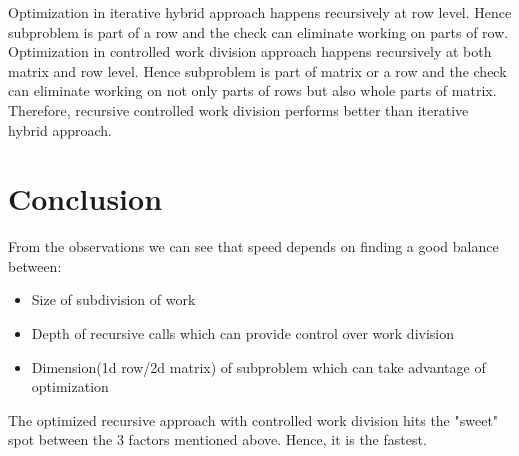 \documentclass{article}
\begin{document}
Optimization in iterative hybrid approach happens recursively at row level.
Hence subproblem is part of a row and the check can eliminate working on parts of row.
Optimization in controlled work division approach happens recursively at both matrix and row level.
Hence subproblem is part of matrix or a row and the check can eliminate working on not only parts of rows but also whole parts of matrix.
Therefore, recursive controlled work division performs better than iterative hybrid approach.

\section{Conclusion}
From the observations we can see that speed depends on finding a good balance between:
\begin{itemize}
    \item Size of subdivision of work
    \item Depth of recursive calls which can provide control over work division
    \item Dimension(1d row/2d matrix) of subproblem which can take advantage of optimization
\end{itemize}

The optimized recursive approach with controlled work division hits the "sweet" spot between the 3 factors mentioned above.  
Hence, it is the fastest.

\printbibliography
\end{document}
